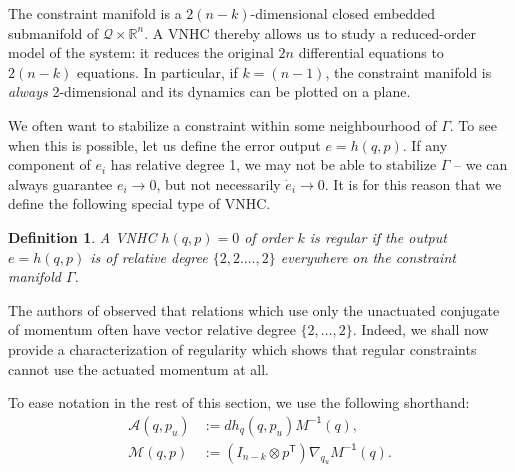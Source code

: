\documentclass[journal,twoside,web]{ieeecolor}
\newtheorem{defn}[thm]{Definition} %
\newcommand*{\tpose}{^\mathsf{T}}
\newcommand*{\R}{\mathbb{R}}
\newcommand*{\Minv}{M^\mathsf{-1}}
\newcommand*{\Id}[1]{I_{#1}}
\begin{document}
The constraint manifold is a \(2(n-k)\)-dimensional
closed embedded submanifold of \(\mathcal{Q} \times \R^n\).
A VNHC thereby allows us to study a reduced-order model of the system: it reduces
the original \(2n\) differential equations to \(2(n-k)\) equations.
In particular, if \(k = (n-1)\), the constraint manifold is \textit{always}
2-dimensional and its dynamics can be plotted on a plane. 

We often want to stabilize a constraint within some neighbourhood of \(\Gamma\).
To see when this is possible, let us define the error output \(e = h(q,p)\).
If any component of \(e_i\) has relative degree 1, we may not be able
to stabilize \(\Gamma\) -- we can always guarantee \(e_i \to 0\), but not
necessarily \(\dot{e}_i \to 0\).
It is for this reason that we define the following special type of VNHC.

\begin{defn}
    A VNHC \(h(q,p) = 0\) of order \(k\) is \textit{regular} if the output 
    \(e = h(q,p)\) is of relative degree \(\{2,2.\ldots,2\}\) everywhere on the
    constraint manifold \(\Gamma\).
\end{defn}

The authors of
\cite{nhvc_dynamic_walking,hybrid_zero_dynamics_bipedal_nhvcs}
observed that relations which use only the unactuated conjugate of momentum
often have vector relative degree \(\{2,\ldots,2\}\).
Indeed, we shall now provide a characterization of regularity which shows that
regular constraints cannot use the actuated momentum at all.

To ease notation in the rest of this section, we use the following shorthand:
\begin{align}
    \mathcal{A}(q,p_u) &:= dh_q(q,p_u) \Minv(q) 
        ,\\
    \mathcal{M}(q,p) &:= (\Id{n-k} \otimes p\tpose)\nabla_{q_u}\Minv(q) 
    .
\end{align}
\end{document}

